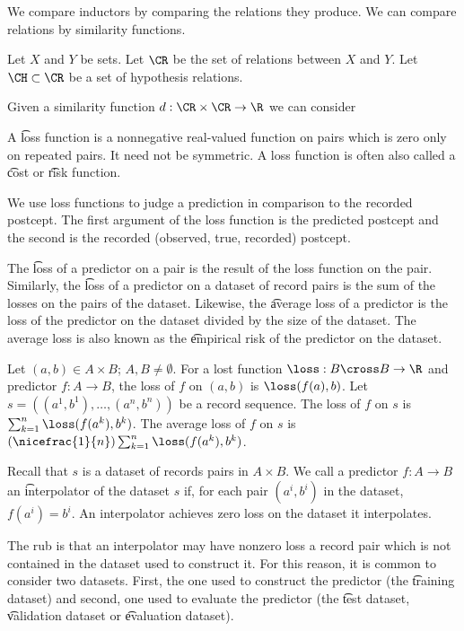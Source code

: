 

We compare inductors by comparing the relations they produce.
We can compare relations by similarity functions.


Let $X$ and $Y$ be sets.
Let $\CR$ be the set of relations between $X$ and $Y$.
Let $\CH \subset \CR$ be a set of hypothesis relations.

Given a similarity function $d: \CR \times \CR \to \R$ we can consider

A \t{loss} function is a nonnegative real-valued function on pairs which is zero only on repeated pairs.
It need not be symmetric.
A loss function is often also called a \t{cost} or \t{risk} function.

We use loss functions to judge a prediction in comparison to the recorded postcept.
The first argument of the loss function is the predicted postcept and the second is the recorded (observed, true, recorded) postcept.

The \t{loss of a predictor on a pair} is the result of the loss function on the pair.
Similarly, the \t{loss of a predictor on a dataset} of record pairs is the sum of the losses on the pairs of the dataset.
Likewise, the \t{average loss} of a predictor is the loss of the predictor on the dataset divided by the size of the dataset.
The average loss is also known as the \t{empirical risk} of the predictor on the dataset.


Let $(a, b) \in A \times B$; $A, B \neq \emptyset$.
For a lost function $\loss: B \cross B \to \R$ and predictor $f: A \to B$, the loss of $f$ on $(a, b)$ is $\loss(f(a),b)$.
Let $s = ((a^1, b^1), \dots, (a^n, b^n))$
be a record sequence.
The loss of $f$ on $s$ is $\sum_{k = 1}^{n} \loss(f(a^k), b^k)$.
The average loss of $f$ on $s$ is $(\nicefrac{1}{n})\sum_{k = 1}^{n} \loss(f(a^k), b^k)$.


Recall that $s$ is a dataset of records pairs in $A \times B$.
We call a predictor $f: A \to B$ an \t{interpolator} of the dataset $s$ if, for each pair $(a^i, b^i)$ in the dataset, $f(a^i) = b^i$.
An interpolator achieves zero loss on the dataset it interpolates.

The rub is that an interpolator may have nonzero loss a record pair which is not contained in the dataset used to construct it.
For this reason, it is common to consider two datasets.
First, the one used to construct the predictor (the \t{training dataset}) and second, one used to evaluate the predictor (the \t{test dataset}, \t{validation dataset} or \t{evaluation dataset}).

